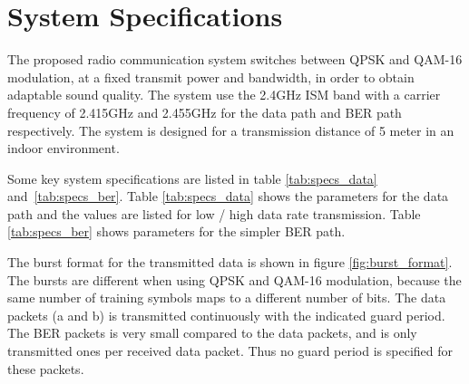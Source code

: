 \section{System Specifications}
\label{sec:specifications}
The proposed radio communication system switches between QPSK and QAM-16 modulation, at a fixed transmit power and bandwidth, in order to obtain adaptable sound quality.  The system use the 2.4GHz ISM band with a carrier frequency of 2.415GHz and 2.455GHz for the data path and BER path respectively. The system is designed for a transmission distance of 5 meter in an indoor environment.

Some key system specifications are listed in table \ref{tab:specs_data} and \ref{tab:specs_ber}. Table \ref{tab:specs_data} shows the parameters for the data path and the values are listed for low / high data rate transmission. Table \ref{tab:specs_ber} shows parameters for the simpler BER path. 


The burst format for the transmitted data is shown in figure \ref{fig:burst_format}. The bursts are different when using QPSK and QAM-16 modulation, because the same number of training symbols maps to a different number of bits. The data packets (a and b) is transmitted continuously with the indicated guard period. The BER packets is very small compared to the data packets, and is only transmitted ones per received data packet. Thus no guard period is specified for these packets. 

 